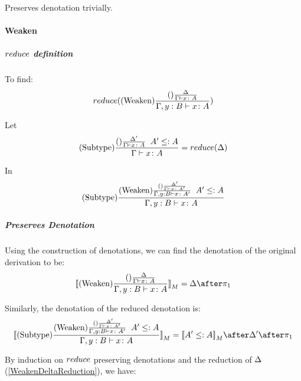 {            Preserves denotation trivially.

            \paragraph{Weaken}
            \subparagraph{$reduce$ definition}
            To find:
            \begin{equation}
                reduce((\text{Weaken}) \frac{(\text{}) \frac{\Delta}{\Gamma \vdash x \colon A}}{\Gamma, y: B \vdash x \colon A})
            \end{equation}

            Let 
            \begin{equation}\label{WeakenDeltaReduction}
                (\text{Subtype}) \frac{(\text{}) \frac{\Delta'}{\Gamma \vdash x \colon A}\;\; A'\leq: A}{\Gamma \vdash x \colon A} = reduce(\Delta)
            \end{equation}

            In 
            \begin{equation}
                (\text{Subtype}) \frac{
                (\text{Weaken}) \frac{
                    (\text{}) \frac{\Delta'}{\Gamma \vdash x \colon A'}
                }{
                    \Gamma, y: B \vdash x \colon A'
                }
                \;\;
                A' \leq: A
                }{\Gamma, y: B \vdash x \colon A}
            \end{equation}

            \subparagraph{Preserves Denotation}
            Using the construction of denotations, we can find the denotation of the original derivation to be:
            \begin{equation}
                \deno{\treerule{Weaken}{\treerule{}{\D}{\gtyperelation{x}{A}}}{\typerelation{\gby}{x}{A}}} = \D \after \p
            \end{equation}

            Similarly, the denotation of the reduced denotation is:
            \begin{equation}
                \deno{\treerule{Subtype}{
                    \treerule{Weaken}{
                        \treerule{}{\D'}{\gtyperelation{x}{A'}}
                    } {
                        \typerelation{\gby}{x}{A'}
                    }
                    \s\s
                    A' \subtype A
                    }{\typerelation{\gby}{x}{A}}} = \deno{A'\subtype A}\after \D' \after \p
            \end{equation}


            By induction on $reduce$ preserving denotations and the reduction of $\Delta$ (\ref{WeakenDeltaReduction}), we have:

}
